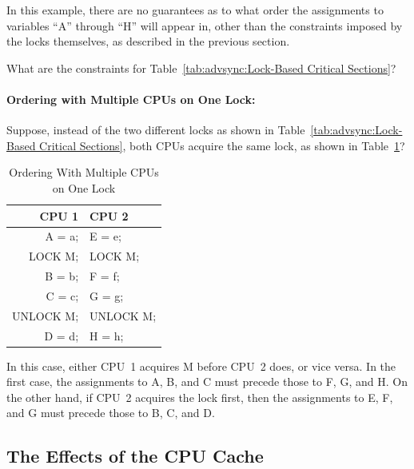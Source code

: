 In this example, there are no guarantees as to what order the
assignments to variables ``A'' through ``H'' will appear in, other
than the constraints imposed by the locks themselves, as
described in the previous section.

\QuickQuiz{}
	What are the constraints for
	Table~\ref{tab:advsync:Lock-Based Critical Sections}?
 \QuickQuizEnd

\paragraph{Ordering with Multiple CPUs on One Lock:}
Suppose, instead of the two different locks as shown in
Table~\ref{tab:advsync:Lock-Based Critical Sections}, both CPUs acquire
the same lock, as shown in
Table~\ref{tab:advsync:Ordering With Multiple CPUs on One Lock}?

\begin{table}[htbp]
\begin{tabular}{r|l}
  CPU 1     & CPU 2 \\
  \hline
  A = a;    & E = e; \\
  LOCK M;   & LOCK M; \\
  B = b;    & F = f; \\
  C = c;    & G = g; \\
  UNLOCK M; & UNLOCK M; \\
  D = d;    & H = h; \\
\end{tabular}
\caption{Ordering With Multiple CPUs on One Lock}
\label{tab:advsync:Ordering With Multiple CPUs on One Lock}
\end{table}

In this case, either CPU~1 acquires M before CPU~2 does, or vice versa.
In the first case, the assignments to A, B, and C must precede
those to F, G, and H.
On the other hand, if CPU~2 acquires the lock first, then the
assignments to E, F, and G must precede those to B, C, and D.

\subsection{The Effects of the CPU Cache}
\label{sec:advsync:The Effects of the CPU Cache}

